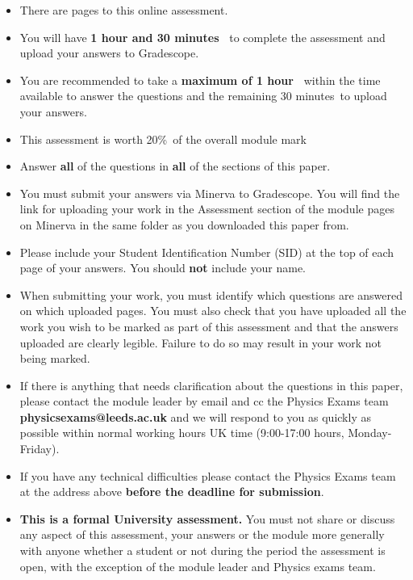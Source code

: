 \documentclass[12pt]{article}
\def\totaltime{1 hour and 30 minutes\ } %
\def\answertime{1 hour\ } %
\def\uploadtime{30 minutes}%
\def\paperweight{20\%\ }
\begin{document}
\begin{itemize}[itemsep=0pt,topsep=0pt]
\item There are \pageref{LastPage} pages to this online assessment.
\item You will have \textbf{\totaltime} to complete the assessment and upload your answers to Gradescope.
\item You are recommended to take a \textbf{maximum of \answertime} within the time available to answer the questions and the remaining \uploadtime\ to upload your answers. 
\item This assessment is worth \paperweight of the overall module mark
\item Answer \textbf{all} of the questions in \textbf{all} of the sections of this paper.
\item You must submit your answers via Minerva to Gradescope. You will find the link for uploading your work in the Assessment section of the module pages on Minerva in the same folder as you downloaded this paper from.
\item Please include your Student Identification Number (SID) at the top of each page of your answers. You should \textbf{not} include your name.
\item When submitting your work, you must identify which questions are answered on which uploaded pages. You must also check that you have uploaded all the work you wish to be marked as part of this assessment and that the answers uploaded are clearly legible. Failure to do so may result in your work not being marked.
\item If there is anything that needs clarification about the questions in this paper, please contact the module leader by email and cc the Physics Exams team \textbf{physicsexams@leeds.ac.uk} and we will respond to you as quickly as possible within normal working hours UK time (9:00-17:00 hours, Monday-Friday). 
\item If you have any technical difficulties please contact the Physics Exams team at the address above \textbf{before the deadline for submission}.
\item \textbf{This is a formal University assessment.} You must not share or discuss any aspect of this assessment, your answers or the module more generally with anyone whether a student or not during the period the assessment is open, with the exception of the module leader and Physics exams team.
\end{itemize}	
	
\end{document}
